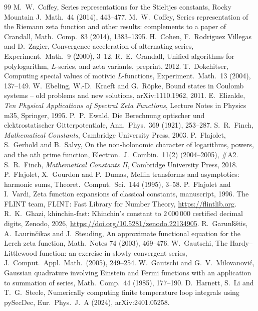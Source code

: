 \documentclass[11pt]{amsart}
\theoremstyle{definition}
\theoremstyle{remark}
\begin{document}
\begin{thebibliography}{99}
 M.~W.~Coffey, Series representations for the Stieltjes constants, Rocky Mountain J.\ Math.\ 44 (2014),
443--477.
 M.~W.~Coffey, Series representation of the Riemann zeta function and other results: complements to a paper of Crandall, Math.\ Comp.\ 83 (2014), 1383--1395.
 H.~Cohen, F.~Rodriguez Villegas and D.~Zagier, Convergence acceleration of alternating series, Experiment.\ Math.\ 9 (2000), 3--12.
 R.~E.~Crandall, Unified algorithms for polylogarithm, $L$-series, and zeta variants, preprint, 2012.
 T.~Dokchitser, Computing special values of motivic $L$-functions, Experiment.\ Math.\ 13 (2004), 137--149.
 W.~Ebeling, W.-D.~Kraeft and G.~R\"opke, Bound states in Coulomb systems -- old problems and new solutions, arXiv:1110.1962, 2011.
 E.~Elizalde, \emph{Ten Physical Applications of Spectral Zeta Functions}, Lecture Notes in Physics m35, Springer, 1995.
 P.~P.~Ewald, Die Berechnung optischer und elektrostatischer Gitterpotentiale, Ann.\ Phys.\ 369 (1921), 253--287.
 S.~R.~Finch, \emph{Mathematical Constants}, Cambridge University Press, 2003.
 P.~Flajolet, S.~Gerhold and B.~Salvy, On the non-holonomic character of logarithms, powers, and the $n$th prime function, Electron.\ J.\ Combin.\ 11(2) (2004--2005), \#A2.
 S.~R.~Finch, \emph{Mathematical Constants II}, Cambridge University Press, 2018.
 P.~Flajolet, X.~Gourdon and P.~Dumas, Mellin transforms and asymptotics: harmonic sums, Theoret.\ Comput.\ Sci.\ 144 (1995), 3--58.
 P.~Flajolet and I.~Vardi, Zeta function expansions of classical constants, manuscript, 1996.
 The FLINT team, FLINT: Fast Library for Number Theory, \url{https://flintlib.org}.
 R.~K.~Ghazi, khinchin-fast: Khinchin's constant to $2\,000\,000$ certified decimal digits, Zenodo, 2026, \url{https://doi.org/10.5281/zenodo.22134905}.
 R.~Garun\v{k}\v{s}tis, A.~Laurin\v{c}ikas and J.~Steuding, An approximate functional equation for the Lerch zeta function, Math.\ Notes 74 (2003), 469--476.
 W.~Gautschi, The Hardy--Littlewood function: an exercise in slowly convergent series, J.\ Comput.\ Appl.\ Math.\ (2005), 249--254.
 W.~Gautschi and G.~V.~Milovanovi\'c, Gaussian quadrature involving Einstein and Fermi functions with an application to summation of series, Math.\ Comp.\ 44 (1985), 177--190.
 D.~Harnett, S.~Li and T.~G.~Steele, Numerically computing finite temperature loop integrals using pySecDec, Eur.\ Phys.\ J.\ A (2024), arXiv:2401.05258.

\end{thebibliography}
\end{document}
